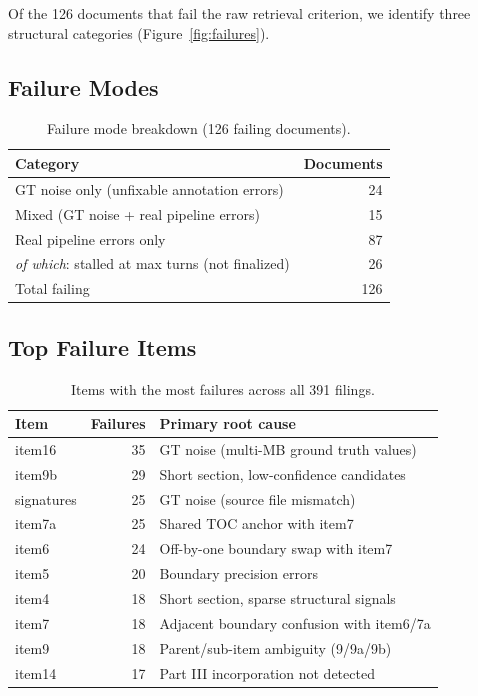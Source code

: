 \documentclass[11pt,a4paper]{article}
\begin{document}
Of the 126 documents that fail the raw retrieval criterion, we identify three structural categories (Figure~\ref{fig:failures}).

\subsection{Failure Modes}

\begin{table}[H]
\centering
\caption{Failure mode breakdown (126 failing documents).}
\begin{tabular}{lr}
\toprule
\textbf{Category} & \textbf{Documents}\\
\midrule
GT noise only (unfixable annotation errors) & 24\\
Mixed (GT noise + real pipeline errors) & 15\\
Real pipeline errors only & 87\\
\quad\emph{of which}: stalled at max turns (not finalized) & 26\\
\midrule
Total failing & 126\\
\bottomrule
\end{tabular}
\end{table}

\subsection{Top Failure Items}

\begin{table}[H]
\centering
\caption{Items with the most failures across all 391 filings.}
\label{tab:top_failures}
\begin{tabular}{lrl}
\toprule
\textbf{Item} & \textbf{Failures} & \textbf{Primary root cause}\\
\midrule
item16 & 35 & GT noise (multi-MB ground truth values)\\
item9b & 29 & Short section, low-confidence candidates\\
signatures & 25 & GT noise (source file mismatch)\\
item7a & 25 & Shared TOC anchor with item7\\
item6 & 24 & Off-by-one boundary swap with item7\\
item5 & 20 & Boundary precision errors\\
item4 & 18 & Short section, sparse structural signals\\
item7 & 18 & Adjacent boundary confusion with item6/7a\\
item9 & 18 & Parent/sub-item ambiguity (9/9a/9b)\\
item14 & 17 & Part III incorporation not detected\\
\bottomrule
\end{tabular}
\end{table}
\end{document}
